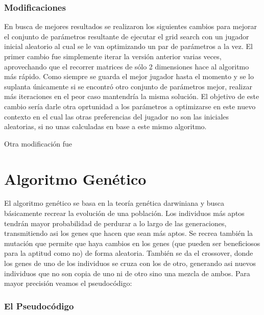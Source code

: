 \documentclass[A4paper,oneside,fleqn,11pt]{article}
\theoremstyle{definition}
\begin{document}
\subsubsection{Modificaciones}

En busca de mejores resultados se realizaron los siguientes cambios para mejorar el conjunto de parámetros resultante de ejecutar el grid search con un jugador inicial aleatorio al cual se le van optimizando un par de parámetros a la vez. El primer cambio fue simplemente iterar la versión anterior varias veces, aprovechando que el recorrer matrices de sólo 2 dimensiones hace al algoritmo más rápido. Como siempre se guarda el mejor jugador hasta el momento y se lo suplanta únicamente si se encontró otro conjunto de parámetros mejor, realizar más iteraciones en el peor caso mantendría la misma solución. El objetivo de este cambio sería darle otra oprtunidad a los parámetros a optimizarse en este nuevo contexto en el cual las otras preferencias del jugador no son las iniciales aleatorias, si no unas calculadas en base a este mismo algoritmo. 

Otra modificación fue 


















\section{Algoritmo Genético}

El algoritmo genético se basa en la teoría genética darwiniana y busca básicamente recrear la evolución de una población. Los individuos más aptos tendrán mayor probabilidad de perdurar a lo largo de las generaciones, transmitiendo asi los genes que hacen que sean más aptos. Se recrea también la mutación que permite que haya cambios en los genes (que pueden ser beneficiosos para la aptitud como no) de forma aleatoria. También se da el crossover, donde los genes de uno de los individuos se cruza con los de otro, generando asi nuevos individuos que no son copia de uno ni de otro sino una mezcla de ambos. Para mayor precisión veamos el pseudocódigo:

\subsubsection{El Pseudocódigo}
\end{document}
